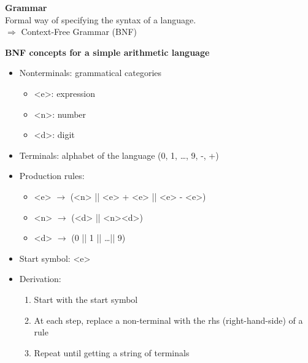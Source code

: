 \documentclass[10pt,letterpaper,landscape]{report}
\newcommand{\boxheight}{21.59cm}
\newcommand{\boxwidth}{8.85cm}
\begin{document}
\begin{small}
{\begin{minipage}[t][\boxheight][c]{\boxwidth}
    \textbf{Grammar}\\
    Formal way of specifying the syntax of a language.\\
    $\Rightarrow$ Context-Free Grammar (BNF)

    \textbf{BNF concepts for a simple arithmetic language}
    \begin{itemize}
        \item Nonterminals: grammatical categories
        \begin{itemize}
            \item <e>: expression
            \item <n>: number
            \item <d>: digit
        \end{itemize}
        \item Terminals: alphabet of the language (0, 1, \dots, 9, -, +)
        \item Production rules:
        \begin{itemize}
            \item <e> $\rightarrow$ (<n> || <e> + <e>  || <e> - <e>)
            \item <n> $\rightarrow$ (<d> || <n><d>)
            \item <d> $\rightarrow$ (0 || 1 || \dots || 9)
        \end{itemize}
        \item Start symbol: <e>
        \item Derivation: 
        \begin{enumerate}
            \item Start with the start symbol
            \item At each step, replace a non-terminal with the rhs (right-hand-side) of a rule
            \item Repeat until getting a string of terminals
            
        \end{enumerate}
    \end{itemize}


\end{minipage}
}\fbox{
\begin{minipage}[t][\boxheight][c]{\boxwidth}


	TODO
 
    
    
\end{minipage}
}\fbox{
\begin{minipage}[t][\boxheight][c]{\boxwidth}


\end{minipage}}
\end{small}
\end{document}

